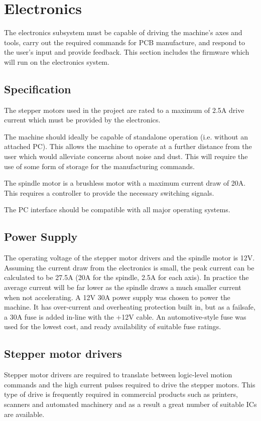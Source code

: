 \section{Electronics}
The electronics subsystem must be capable of driving the machine's axes
and tools, carry out the required commands for PCB manufacture, and 
respond to the user's input and provide feedback. This section includes
the firmware which will run on the electronics system. 

\subsection{Specification}
The stepper motors used in the project are rated to a maximum of 2.5A
drive current which must be provided by the electronics. 

The machine should ideally be capable of standalone operation (i.e. without
an attached PC). This allows the machine to operate at a further distance
from the user which would alleviate concerns about noise and dust.
This will require the use of some form of storage for
the manufacturing commands.

The spindle motor is a brushless motor with a maximum current draw of 20A.
This requires a controller to provide the necessary switching signals.

The PC interface should be compatible with all major operating systems.

\subsection{Power Supply}
The operating voltage of the stepper motor drivers and the spindle motor
is 12V. Assuming the current draw from the electronics is small, the 
peak current can be calculated to be 27.5A (20A for the spindle, 2.5A for each axis).
In practice the average current will be far lower as the spindle draws 
a much smaller current when not accelerating. A 12V 30A power supply was
chosen to power the machine. It has over-current and overheating protection built in, but as a failsafe, a 30A fuse is added in-line with the +12V cable. 
An automotive-style fuse was used for the lowest cost, and ready availability of suitable fuse ratings.

\subsection{Stepper motor drivers}
Stepper motor drivers are required to translate between logic-level
motion commands and the high current pulses required to drive the stepper
motors. This type of drive is frequently required in commercial products
such as printers, scanners and automated machinery and as a result a 
great number of suitable ICs are available.

